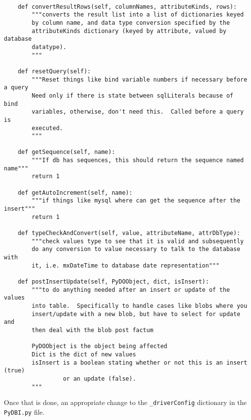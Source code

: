 \documentclass[titlepage]{manual}
\begin{document}
\begin{verbatim}

    def convertResultRows(self, columnNames, attributeKinds, rows):
        """converts the result list into a list of dictionaries keyed
        by column name, and data type conversion specified by the
        attributeKinds dictionary (keyed by attribute, valued by database
        datatype).
        """
        
    def resetQuery(self):
        """Reset things like bind variable numbers if necessary before a query
        Need only if there is state between sqlLiterals because of bind
        variables, otherwise, don't need this.  Called before a query is
        executed.
        """

    def getSequence(self, name):
        """If db has sequences, this should return the sequence named name"""
        return 1

    def getAutoIncrement(self, name):
        """if things like mysql where can get the sequence after the insert"""
        return 1

    def typeCheckAndConvert(self, value, attributeName, attrDbType):
        """check values type to see that it is valid and subsequently
        do any conversion to value necessary to talk to the database with
        it, i.e. mxDateTime to database date representation"""
        
    def postInsertUpdate(self, PyDOObject, dict, isInsert):
        """to do anything needed after an insert or update of the values
        into table.  Specifically to handle cases like blobs where you
        insert/update with a new blob, but have to select for update and
        then deal with the blob post factum

        PyDOObject is the object being affected
        Dict is the dict of new values
        isInsert is a boolean stating whether or not this is an insert (true)
                 or an update (false).
        """
\end{verbatim}
Once that is done, an appropriate change to the \texttt{_driverConfig}
dictionary in the \texttt{PyDBI.py} file.

\cleardoublepage
\printindex
\end{document}
